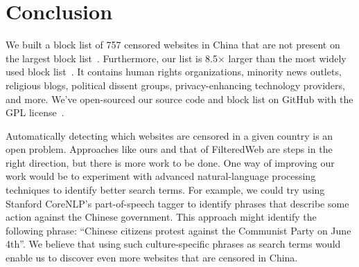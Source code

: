 
\section{Conclusion}
We built a block list of 757 censored websites in China that are not
present on the largest block
list~\cite{darer2017filteredweb}. Furthermore, our list is 8.5$\times$
larger than the most widely used block
list~\cite{citizenlab:block}. It contains human rights organizations,
minority news outlets, religious blogs, political dissent groups,
privacy-enhancing technology providers, and more. We've open-sourced
our source code and block list on GitHub with the GPL
license~\cite{censorsearch-lists}.

Automatically detecting which websites are censored in a given country is an
open problem. Approaches like ours and that of FilteredWeb are steps in the
right direction, but there is more work to be done.  One way of improving
our work would be to experiment with advanced natural-language processing
techniques to identify better search terms. For example, we could try using
Stanford CoreNLP's part-of-speech tagger to identify phrases that describe
some action against the Chinese government. This approach might
identify the following phrase: ``Chinese citizens protest against the Communist Party on June
4th''. We believe that using such culture-specific phrases as search terms
would enable us to discover even more websites that are censored in China.

